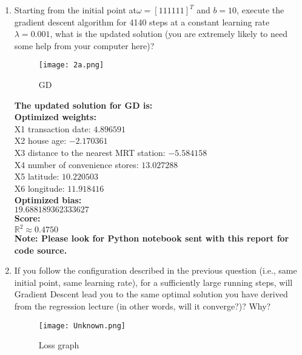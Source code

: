 \documentclass{assignment}
\newcommand{\R}{\mathbb{R}}
\begin{document}
\begin{problem}
\begin{enumerate}
\begin{enumerate}
    \item Starting from the initial point at$ ω = [1 1 1 1 1 1]^T$ and $b = 10$, execute the gradient descent algorithm for 4140 steps at a constant learning rate $\lambda = 0.001$, what is the updated solution (you are extremely likely to need some help from your computer here)?\\

    \begin{figure}[H]
        \centering
        \texttt{[image: 2a.png]}
        \caption{GD}
        \label{fig:enter-label}
    \end{figure}

    \textbf{The updated solution for GD is:} \\
    \textbf{Optimized weights: }\\
    X1 transaction date: $4.896591$\\
    X2 house age: $-2.170361$\\
    X3 distance to the nearest MRT station: $-5.584158$\\
    X4 number of convenience stores: $13.027288$\\
    X5 latitude: $10.220503$\\
    X6 longitude: $11.918416$\\

    \textbf{Optimized bias:} \\$19.688189362333627$ \\

    \textbf{Score:}\\
    $\R^2 \approx 0.4750$\\

    \textbf{Note: Please look for Python notebook sent with this report for code source.}\\

    \item If you follow the configuration described in the previous question (i.e., same initial point, same learning rate), for a sufficiently large running steps, will Gradient Descent lead you to the same optimal solution you have derived from the regression lecture (in other words, will it converge?)? Why?\\

    \begin{figure}[H]
        \centering
        \texttt{[image: Unknown.png]}
        \caption{Loss graph}
        \label{fig:enter-label}
    \end{figure}


\end{enumerate}
\end{enumerate}
\end{problem}
\end{document}
